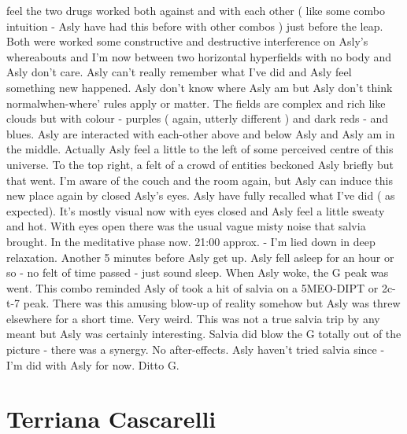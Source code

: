 \documentclass[12pt]{book}
\begin{document}
feel the two drugs worked both against and with each other ( like some combo intuition - Asly have had this before with other combos ) just before the leap. Both were worked some constructive and destructive interference on Asly's whereabouts and I'm now between two horizontal hyperfields with no body and Asly don't care. Asly can't really remember what I've did and Asly feel something new happened. Asly don't know where Asly am but Asly don't think normalwhen-where' rules apply or matter. The fields are complex and rich like clouds but with colour - purples ( again, utterly different ) and dark reds - and blues. Asly are interacted with each-other above and below Asly and Asly am in the middle. Actually Asly feel a little to the left of some perceived centre of this universe. To the top right, a felt of a crowd of entities beckoned Asly briefly but that went. I'm aware of the couch and the room again, but Asly can induce this new place again by closed Asly's eyes. Asly have fully recalled what I've did ( as expected). It's mostly visual now with eyes closed and Asly feel a little sweaty and hot. With eyes open there was the usual vague misty noise that salvia brought. In the meditative phase now. 21:00 approx. - I'm lied down in deep relaxation. Another 5 minutes before Asly get up. Asly fell asleep for an hour or so - no felt of time passed - just sound sleep. When Asly woke, the G peak was went. This combo reminded Asly of took a hit of salvia on a 5MEO-DIPT or 2c-t-7 peak. There was this amusing blow-up of reality somehow but Asly was threw elsewhere for a short time. Very weird. This was not a true salvia trip by any meant but Asly was certainly interesting. Salvia did blow the G totally out of the picture - there was a synergy. No after-effects. Asly haven't tried salvia since - I'm did with Asly for now. Ditto G.






\chapter{Terriana Cascarelli}
\end{document}
